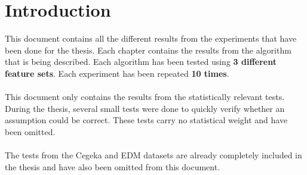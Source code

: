 
\chapter{Introduction} %

This document contains all the different results from the experiments that have been done for the thesis. Each chapter contains the results from the algorithm that is being described. Each algorithm has been tested using \textbf{3 different feature sets}. Each experiment has been repeated \textbf{10 times}. \\
\\
This document only contains the results from the statistically relevant tests. During the thesis, several small tests were done to quickly verify whether an assumption could be correct. These tests carry no statistical weight and have been omitted. \\
\\
The tests from the Cegeka and EDM datasets are already completely included in the thesis and have also been omitted from this document.